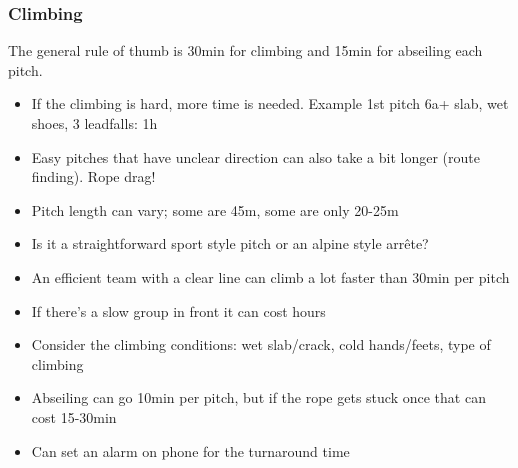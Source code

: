 \subsubsection{Climbing}
The general rule of thumb is 30min for climbing and 15min for abseiling each pitch.
\begin{itemize}
\item If the climbing is hard, more time is needed. Example 1st pitch 6a+ slab, wet shoes, 3 leadfalls: 1h
\item Easy pitches that have unclear direction can also take a bit longer (route finding). Rope drag!
\item Pitch length can vary; some are 45m, some are only 20-25m
\item Is it a straightforward sport style pitch or an alpine style arrête?
\item An efficient team with a clear line can climb a lot faster than 30min per pitch
\item If there's a slow group in front it can cost hours
\item Consider the climbing conditions: wet slab/crack, cold hands/feets, type of climbing
\item Abseiling can go 10min per pitch, but if the rope gets stuck once that can cost 15-30min
\item Can set an alarm on phone for the turnaround time
\end{itemize}



